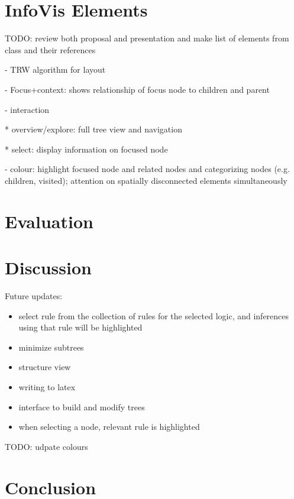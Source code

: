 \documentclass[conference]{IEEEtran}
\begin{document}
\section{InfoVis Elements}


TODO: review both proposal and presentation and make list of elements from class and their references

- TRW algorithm for layout

- Focus+context: shows relationship of focus node to children and parent

- interaction

  * overview/explore: full tree view and navigation

  * select: display information on focused node

- colour: highlight focused node and related nodes and categorizing nodes (e.g. children, visited); attention on spatially disconnected elements simultaneously

\section{Evaluation}


\section{Discussion}


Future updates:

\begin{itemize}
    \item select rule from the collection of rules for the selected logic, and inferences using that rule will be highlighted
    \item minimize subtrees
    \item structure view
    \item writing to latex
    \item interface to build and modify trees
    \item when selecting a node, relevant rule is highlighted
\end{itemize}

TODO: udpate colours

\section{Conclusion}





\end{document}
